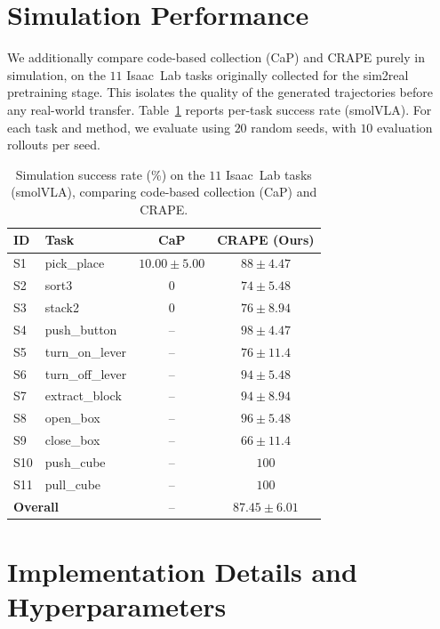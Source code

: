 \documentclass{article}
\begin{document}
\section{Simulation Performance}
\label{app:simperf}

We additionally compare code-based collection (CaP) and CRAPE purely in
simulation, on the $11$ Isaac~Lab tasks originally collected for the sim2real
pretraining stage. This isolates the quality of the generated trajectories before
any real-world transfer. Table~\ref{tab:simperf} reports per-task success rate
(smolVLA). For each task and method, we evaluate using $20$ random seeds, with
$10$ evaluation rollouts per seed.

\begin{table}[h]
\centering
\caption{Simulation success rate (\%) on the $11$ Isaac~Lab tasks (smolVLA), comparing code-based collection (CaP) and CRAPE.}
\label{tab:simperf}
\small
\setlength{\tabcolsep}{6pt}
\begin{tabular}{llcc}
\toprule
\textbf{ID} & \textbf{Task} & \textbf{CaP} & \textbf{CRAPE (Ours)} \\
\midrule
S1  & pick\_place & $10.00 \pm 5.00$ & $88 \pm 4.47$ \\
S2  & sort3 & 0 & $74 \pm 5.48$ \\
S3  & stack2 & 0 & $76 \pm 8.94$ \\
S4  & push\_button & -- & $98 \pm 4.47$ \\
S5  & turn\_on\_lever & -- & $76 \pm 11.4$ \\
S6  & turn\_off\_lever & -- & $94 \pm 5.48$ \\
S7  & extract\_block & -- & $94 \pm 8.94$ \\
S8  & open\_box & -- & $96 \pm 5.48$ \\
S9  & close\_box & -- & $66 \pm 11.4$ \\
S10 & push\_cube & -- & $100$ \\
S11 & pull\_cube & -- & $100$ \\
\midrule
\multicolumn{2}{l}{\textbf{Overall}} & -- & $87.45 \pm 6.01$ \\
\bottomrule
\end{tabular}
\end{table}

\section{Implementation Details and Hyperparameters}
\label{app:hparams}
\end{document}
